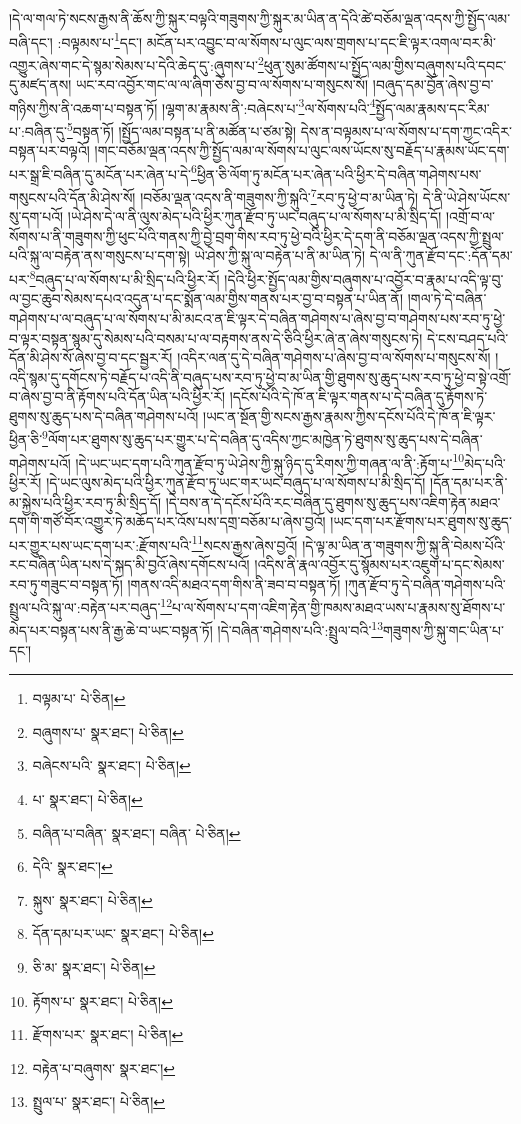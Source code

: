 །དེ་ལ་གལ་ཏེ་སངས་རྒྱས་ནི་ཆོས་ཀྱི་སྐུར་བལྟའི་གཟུགས་ཀྱི་སྐུར་མ་ཡིན་ན་དེའི་ཚེ་བཅོམ་ལྡན་འདས་ཀྱི་སྤྱོད་ལམ་བཞི་དང་། :བལྟམས་པ་\footnote{བལྟམ་པ་  པེ་ཅིན། }དང་། མངོན་པར་འབྱུང་བ་ལ་སོགས་པ་ལུང་ལས་གྲགས་པ་དང་ཇི་ལྟར་འགལ་བར་མི་འགྱུར་ཞེས་གང་དེ་སྙམ་སེམས་པ་དེའི་ཆེད་དུ་:ཞུགས་པ་\footnote{བཞུགས་པ་  སྣར་ཐང་།  པེ་ཅིན། }ཕུན་སུམ་ཚོགས་པ་སྤྱོད་ལམ་གྱིས་བཞུགས་པའི་དབང་དུ་མཛད་ནས། ཡང་རབ་འབྱོར་གང་ལ་ལ་ཞིག་ཅེས་བྱ་བ་ལ་སོགས་པ་གསུངས་སོ། །བཞུད་དམ་བྱོན་ཞེས་བྱ་བ་གཉིས་ཀྱིས་ནི་འཆག་པ་བསྟན་ཏོ། །ལྷག་མ་རྣམས་ནི་:བཞེངས་པ་\footnote{བཞེངས་པའི་  སྣར་ཐང་།  པེ་ཅིན། }ལ་སོགས་པའི་\footnote{པ་  སྣར་ཐང་།  པེ་ཅིན། }སྤྱོད་ལམ་རྣམས་དང་རིམ་པ་:བཞིན་དུ་\footnote{བཞིན་པ་བཞིན་  སྣར་ཐང་། བཞིན་  པེ་ཅིན། }བསྟན་ཏོ། །སྤྱོད་ལམ་བསྟན་པ་ནི་མཚོན་པ་ཙམ་སྟེ། དེས་ན་བལྟམས་པ་ལ་སོགས་པ་དག་ཀྱང་འདིར་བསྟན་པར་བལྟའོ། །གང་བཅོམ་ལྡན་འདས་ཀྱི་སྤྱོད་ལམ་ལ་སོགས་པ་ལུང་ལས་ཡོངས་སུ་བརྗོད་པ་རྣམས་ཡོང་དག་པར་སྒྲ་ཇི་བཞིན་དུ་མངོན་པར་ཞེན་པ་དེ་\footnote{དེའི་  སྣར་ཐང་། }ཕྱིན་ཅི་ལོག་ཏུ་མངོན་པར་ཞེན་པའི་ཕྱིར་དེ་བཞིན་གཤེགས་པས་གསུངས་པའི་དོན་མི་ཤེས་སོ། །བཅོམ་ལྡན་འདས་ནི་གཟུགས་ཀྱི་སྐུའི་\footnote{སྐུས་  སྣར་ཐང་།  པེ་ཅིན། }རབ་ཏུ་ཕྱེ་བ་མ་ཡིན་ཏེ། དེ་ནི་ཡེ་ཤེས་ཡོངས་སུ་དག་པའོ། །ཡེ་ཤེས་དེ་ལ་ནི་ལུས་མེད་པའི་ཕྱིར་ཀུན་རྫོབ་ཏུ་ཡང་བཞུད་པ་ལ་སོགས་པ་མི་སྲིད་དོ། །འགྲོ་བ་ལ་སོགས་པ་ནི་གཟུགས་ཀྱི་ཕུང་པོའི་གནས་ཀྱི་བྱེ་བྲག་གིས་རབ་ཏུ་ཕྱེ་བའི་ཕྱིར་དེ་དག་ནི་བཅོམ་ལྡན་འདས་ཀྱི་སྤྲུལ་པའི་སྐུ་ལ་བརྟེན་ནས་གསུངས་པ་དག་སྟེ། ཡེ་ཤེས་ཀྱི་སྐུ་ལ་བརྟེན་པ་ནི་མ་ཡིན་ཏེ། དེ་ལ་ནི་ཀུན་རྫོབ་དང་:དོན་དམ་པར་\footnote{དོན་དམ་པར་ཡང་  སྣར་ཐང་།  པེ་ཅིན། }བཞུད་པ་ལ་སོགས་པ་མི་སྲིད་པའི་ཕྱིར་རོ། །དེའི་ཕྱིར་སྤྱོད་ལམ་གྱིས་བཞུགས་པ་འབྱོར་བ་རྣམ་པ་འདི་ལྟ་བུ་ལ་བྱང་ཆུབ་སེམས་དཔའ་འདུན་པ་དང་སྨོན་ལམ་གྱིས་གནས་པར་བྱ་བ་བསྟན་པ་ཡིན་ནོ། །གལ་ཏེ་དེ་བཞིན་གཤེགས་པ་ལ་བཞུད་པ་ལ་སོགས་པ་མི་མངའ་ན་ཇི་ལྟར་དེ་བཞིན་གཤེགས་པ་ཞེས་བྱ་བ་གཤེགས་པས་རབ་ཏུ་ཕྱེ་བ་ལྟར་བསྟན་སྙམ་དུ་སེམས་པའི་བསམ་པ་ལ་བརྟགས་ནས་དེ་ཅིའི་ཕྱིར་ཞེ་ན་ཞེས་གསུངས་ཏེ། དེ་ངས་བཤད་པའི་དོན་མི་ཤེས་སོ་ཞེས་བྱ་བ་དང་སྦྱར་རོ། །འདིར་ལན་དུ་དེ་བཞིན་གཤེགས་པ་ཞེས་བྱ་བ་ལ་སོགས་པ་གསུངས་སོ། །འདི་སྙམ་དུ་དགོངས་ཏེ་བརྗོད་པ་འདི་ནི་བཞུད་པས་རབ་ཏུ་ཕྱེ་བ་མ་ཡིན་གྱི་ཐུགས་སུ་ཆུད་པས་རབ་ཏུ་ཕྱེ་བ་སྟེ་འགྲོ་བ་ཞེས་བྱ་བ་ནི་རྟོགས་པའི་དོན་ཡིན་པའི་ཕྱིར་རོ། །དངོས་པོའི་དེ་ཁོ་ན་ཇི་ལྟར་གནས་པ་དེ་བཞིན་དུ་རྟོགས་ཏེ་ཐུགས་སུ་ཆུད་པས་དེ་བཞིན་གཤེགས་པའོ། །ཡང་ན་སྔོན་གྱི་སངས་རྒྱས་རྣམས་ཀྱིས་དངོས་པོའི་དེ་ཁོ་ན་ཇི་ལྟར་ཕྱིན་ཅི་\footnote{ཅི་མ་  སྣར་ཐང་།  པེ་ཅིན། }ལོག་པར་ཐུགས་སུ་ཆུད་པར་གྱུར་པ་དེ་བཞིན་དུ་འདིས་ཀྱང་མཁྱེན་ཏེ་ཐུགས་སུ་ཆུད་པས་དེ་བཞིན་གཤེགས་པའོ། །དེ་ཡང་ཡང་དག་པའི་ཀུན་རྫོབ་ཏུ་ཡེ་ཤེས་ཀྱི་སྐུ་ཉིད་དུ་རིགས་ཀྱི་གཞན་ལ་ནི་:རྟོག་པ་\footnote{རྟོགས་པ་  སྣར་ཐང་།  པེ་ཅིན། }མེད་པའི་ཕྱིར་རོ། །དེ་ཡང་ལུས་མེད་པའི་ཕྱིར་ཀུན་རྫོབ་ཏུ་ཡང་གར་ཡང་བཞུད་པ་ལ་སོགས་པ་མི་སྲིད་དོ། །དོན་དམ་པར་ནི་མ་སྐྱེས་པའི་ཕྱིར་རབ་ཏུ་མི་སྲིད་དོ། །དེ་བས་ན་དེ་དངོས་པོའི་རང་བཞིན་དུ་ཐུགས་སུ་ཆུད་པས་འཇིག་རྟེན་མཐའ་དག་གི་གཙོ་བོར་འགྱུར་ཏེ་མཆོད་པར་འོས་པས་དགྲ་བཅོམ་པ་ཞེས་བྱའོ། །ཡང་དག་པར་རྫོགས་པར་ཐུགས་སུ་ཆུད་པར་གྱུར་པས་ཡང་དག་པར་:རྫོགས་པའི་\footnote{རྫོགས་པར་  སྣར་ཐང་།  པེ་ཅིན། }སངས་རྒྱས་ཞེས་བྱའོ། །དེ་ལྟ་མ་ཡིན་ན་གཟུགས་ཀྱི་སྐུ་ནི་བེམས་པོའི་རང་བཞིན་ཡིན་པས་དེ་སྐད་མི་བྱའོ་ཞེས་དགོངས་པའོ། །འདིས་ནི་རྣལ་འབྱོར་དུ་སྙོམས་པར་འཇུག་པ་དང་སེམས་རབ་ཏུ་གཟུང་བ་བསྟན་ཏོ། །གནས་འདི་མཐའ་དག་གིས་ནི་ཟབ་བ་བསྟན་ཏོ། །ཀུན་རྫོབ་ཏུ་དེ་བཞིན་གཤེགས་པའི་སྤྲུལ་པའི་སྐུ་ལ་:བརྟེན་པར་བཞུད་\footnote{བརྟེན་པ་བཞུགས་  སྣར་ཐང་། }པ་ལ་སོགས་པ་དག་འཇིག་རྟེན་གྱི་ཁམས་མཐའ་ཡས་པ་རྣམས་སུ་ཐོགས་པ་མེད་པར་བསྟན་པས་ནི་རྒྱ་ཆེ་བ་ཡང་བསྟན་ཏོ། །དེ་བཞིན་གཤེགས་པའི་:སྤྲུལ་བའི་\footnote{སྤྲུལ་པ་  སྣར་ཐང་།  པེ་ཅིན། }གཟུགས་ཀྱི་སྐུ་གང་ཡིན་པ་དང་། 
